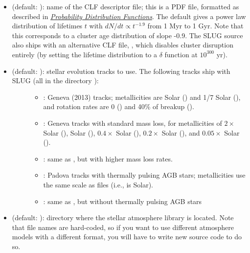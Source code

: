 \documentclass[letterpaper,10pt,english]{sphinxmanual}
\begin{document}
\begin{itemize}
\item {} 
 (default: ): name of the CLF descriptor file; this is a PDF file, formatted as described in {\hyperref[pdfs:sec\string-pdfs]{\emph{Probability Distribution Functions}}}. The default gives a power law distribution of lifetimes \(t\) with \(dN/dt\propto t^{-1.9}\) from 1 Myr to 1 Gyr. Note that this corresponds to a cluster age distribution of slope -0.9. The SLUG source also ships with an alternative CLF file, , which disables cluster disruption entirely (by setting the lifetime distribution to a \(\delta\) function at \(10^{300}\) yr).

\item {} \begin{description}
\item[{ (default: ): stellar evolution tracks to use. The following tracks ship with SLUG (all in the directory ):}] \leavevmode\begin{itemize}
\item {} 
: Geneva (2013) tracks; metallicities are Solar () and 1/7 Solar (), and rotation rates are 0 () and 40\% of breakup ().

\item {} 
: Geneva tracks with standard mass loss, for metallicities of \(2\times\) Solar (), Solar (), \(0.4\times\) Solar (), \(0.2\times\) Solar (), and \(0.05\times\) Solar ().

\item {} 
: same as , but with higher mass loss rates.

\item {} 
: Padova tracks with thermally pulsing AGB stars; metallicities use the same scale as  files (i.e.,  is Solar).

\item {} 
: same as , but without thermally pulsing AGB stars

\end{itemize}

\end{description}

\item {} 
 (default: ): directory where the stellar atmosphere library is located. Note that file names are hard-coded, so if you want to use different atmosphere models with a different format, you will have to write new source code to do so.


\end{itemize}
\end{document}
